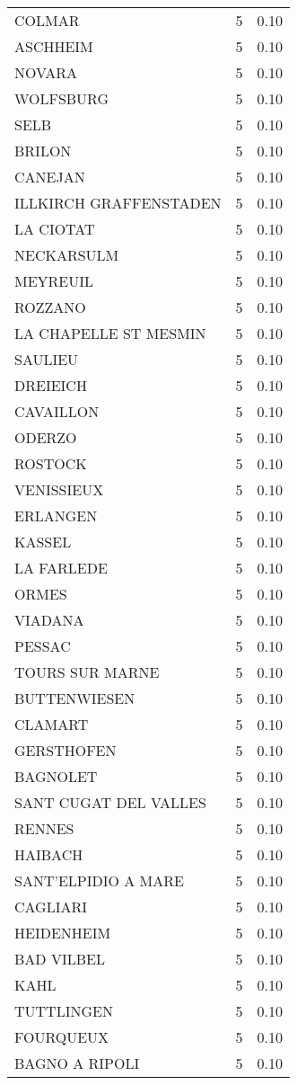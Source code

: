 \begin{table*}[htbp]
\begin{tabular}{lrr}
COLMAR & 5 & 0.10 \\
ASCHHEIM & 5 & 0.10 \\
NOVARA & 5 & 0.10 \\
WOLFSBURG & 5 & 0.10 \\
SELB & 5 & 0.10 \\
BRILON & 5 & 0.10 \\
CANEJAN & 5 & 0.10 \\
ILLKIRCH GRAFFENSTADEN & 5 & 0.10 \\
LA CIOTAT & 5 & 0.10 \\
NECKARSULM & 5 & 0.10 \\
MEYREUIL & 5 & 0.10 \\
ROZZANO & 5 & 0.10 \\
LA CHAPELLE ST MESMIN & 5 & 0.10 \\
SAULIEU & 5 & 0.10 \\
DREIEICH & 5 & 0.10 \\
CAVAILLON & 5 & 0.10 \\
ODERZO & 5 & 0.10 \\
ROSTOCK & 5 & 0.10 \\
VENISSIEUX & 5 & 0.10 \\
ERLANGEN & 5 & 0.10 \\
KASSEL & 5 & 0.10 \\
LA FARLEDE & 5 & 0.10 \\
ORMES & 5 & 0.10 \\
VIADANA & 5 & 0.10 \\
PESSAC & 5 & 0.10 \\
TOURS SUR MARNE & 5 & 0.10 \\
BUTTENWIESEN & 5 & 0.10 \\
CLAMART & 5 & 0.10 \\
GERSTHOFEN & 5 & 0.10 \\
BAGNOLET & 5 & 0.10 \\
SANT CUGAT DEL VALLES & 5 & 0.10 \\
RENNES & 5 & 0.10 \\
HAIBACH & 5 & 0.10 \\
SANT'ELPIDIO A MARE & 5 & 0.10 \\
CAGLIARI & 5 & 0.10 \\
HEIDENHEIM & 5 & 0.10 \\
BAD VILBEL & 5 & 0.10 \\
KAHL & 5 & 0.10 \\
TUTTLINGEN & 5 & 0.10 \\
FOURQUEUX & 5 & 0.10 \\
BAGNO A RIPOLI & 5 & 0.10 \\

\end{tabular}
\end{table*}
